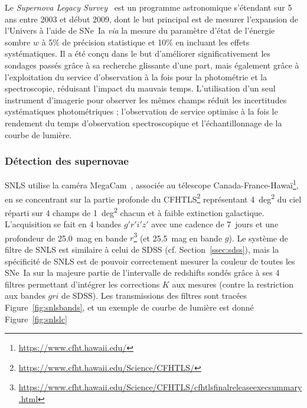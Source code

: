 \documentclass[../main/main.tex]{subfiles}
\begin{document}
Le \textit{Supernova Legacy Survey}~\citep[SNLS,][]{astier2006, sullivan2011}
est un programme astronomique s'étendant sur 5 ans entre 2003 et début 2009,
dont le but principal est de mesurer l'expansion de l'Univers à l'aide de SNe~Ia
\textit{via} la mesure du paramètre d'état de l'énergie sombre $w$ à 5\% de
précision statistique et 10\% en incluant les effets systématiques. Il a été
conçu dans le but d'améliorer significativement les sondages passés grâce à sa
recherche glissante d'une part, mais également grâce à l'exploitation du service
d'observation à la fois pour la photométrie et la spectroscopie, réduisant
l'impact du mauvais temps. L'utilisation d'un seul instrument d'imagerie pour
observer les mêmes champs réduit les incertitudes systématiques photométriques ;
l'observation de service optimise à la fois le rendement du temps d'observation
spectroscopique et l'échantillonnage de la courbe de lumière.

\subsubsection{Détection des supernovae}\label{sssec:snlsdetec}

SNLS utilise la caméra MegaCam~\citep{boulade2003}, associée au télescope
Canada-France-Hawaï\footnote{\href{https://www.cfht.hawaii.edu/}
{https://www.cfht.hawaii.edu/}}, en se concentrant sur la partie profonde du
CFHTLS\footnote{\href{https://www.cfht.hawaii.edu/Science/CFHTLS/}
{https://www.cfht.hawaii.edu/Science/CFHTLS/}} représentant \SI{4}{deg^2} du
ciel réparti sur 4 champs de \SI{1}{deg^2} chacun et à faible extinction
galactique. L'acquisition se fait en 4 bandes $g'r'i'z'$ avec une cadence de
\SI{7}{jours} et une profondeur de \SI{25,0}{mag} en bande
$r$\footnote{\href{https://www.cfht.hawaii.edu/Science/CFHTLS/cfhtlsfinalreleaseexecsummary.html}
{https://www.cfht.hawaii.edu/Science/CFHTLS/cfhtlsfinalreleaseexecsummary.html}}
(et \SI{25,5}{mag} en bande $g$). Le système de filtre de SNLS est similaire à
celui de SDSS (cf. Section~\ref{ssec:sdss}), mais la spécificité de SNLS est de
pouvoir correctement mesurer la couleur de toutes les SNe~Ia sur la majeure
partie de l'intervalle de redshifts sondés grâce à ses 4 filtres permettant
d'intégrer les corrections $K$ aux mesures (contre la restriction aux bandes
$gri$ de SDSS). Les transmissions des filtres sont tracées
Figure~\ref{fig:snlsbands}, et un exemple de courbe de lumière est donné
Figure~\ref{fig:snlslc}
\end{document}
